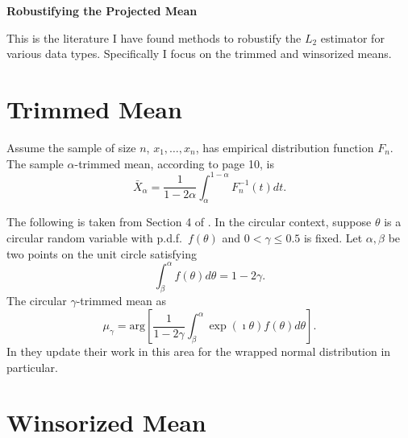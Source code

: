 \documentclass{article}\usepackage[]{graphicx}\usepackage[]{color}
\begin{document}
\begin{center}
\Large{\bf Robustifying the Projected Mean}
\end{center}
\normalsize
This is the literature I have found methods to robustify the $L_2$ estimator for various data types.  Specifically I focus on the trimmed and winsorized means.



 
\section{Trimmed Mean}

Assume the sample of size $n$, $x_1,\dots,x_n$, has empirical distribution function $F_n$.  The sample $\alpha$-trimmed mean, according to \cite{huber2009} page 10, is
\[
\bar{X}_\alpha=\frac{1}{1-2\alpha}\int_{\alpha}^{1-\alpha}F_n^{-1}(t)dt.
\]

The following is taken from Section 4 of \cite{laha2011}. In the circular context, suppose $\theta$ is a circular random variable with p.d.f.~$f(\theta)$ and $0<\gamma\leq 0.5$ is fixed.  Let $\alpha,\beta$ be two points on the unit circle satisfying
\[
\int_{\beta}^\alpha f(\theta)d\theta=1-2\gamma.
\] 
The circular $\gamma$-trimmed mean as
\[
\mu_\gamma=\text{arg}\left[\frac{1}{1-2\gamma}\int^{\alpha}_\beta\exp(\imath\theta)f(\theta)d\theta\right].
\]
In \cite{laha2013} they update their work in this area for the wrapped normal distribution in particular.




\section{Winsorized Mean}

%

\end{document}
